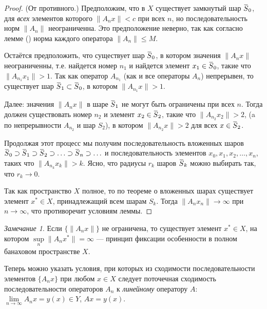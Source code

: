 \documentclass[12pt,a4paper,titlepage,oneside]{book}
\newcommand{\overbar}[1]{\mkern 1.5mu\overline{\mkern-1.5mu#1\mkern-1.5mu}\mkern 1.5mu}
\newcommand{\rom}[1]{\uppercase\expandafter{\romannumeral #1\relax}}
\theoremstyle{definition}
\theoremstyle{plain}
\theoremstyle{break}
\theoremstyle{remark}
\newtheorem*{remark}{Замечание}
\theoremstyle{remark}
\theoremstyle{remark}
\theoremstyle{remark}
\theoremstyle{plain}
\theoremstyle{plain}
\begin{document}
\begin{proof}
(От противного.)
Предположим, что в $X$ существует замкнутый шар $\overbar{S}_0$, для \textit{всех} элементов которого $\lVert A_n x\rVert < c$ при всех $n$, но последовательность норм $\lVert A_n\rVert$ неограниченна. Это предположение неверно, так как согласно лемме (\rom{1}) норма каждого оператора $\lVert A_n\rVert \leqslant M$.

Остаётся предположить, что существует шар $\overbar{S}_0$, в котором значения $\lVert A_n x\rVert$ неограниченны, т.е. найдется номер $n_1$ и найдется элемент $x_1 \in \overbar{S}_0$, такие что $\lVert A_{n_1} x_1 \rVert > 1$. Так как оператор $A_{n_1}$ (как и все операторы $A_n$) непрерывен, то существует шар $\overbar{S}_1 \subset \overbar{S}_0$, в котором $\lVert A_{n_1} x \rVert > 1$.

Далее: значения $\lVert A_n x\rVert$ в шаре $\overbar{S}_1$ не могут быть ограничены при всех $n$. Тогда должен существовать номер $n_2$ и элемент $x_2 \in \overbar{S}_2$, такие что $\lVert A_{n_2} x_2 \rVert > 2$, (a по непрерывности $A_{n_2}$ и шар $S_2$), в котором $\lVert A_{n_2} x \rVert > 2$ для всех $x \in \overbar{S}_2$.

Продолжая этот процесс мы получим последовательность вложенных шаров $\overbar{S}_0 \supset \overbar{S}_1 \supset \overbar{S}_2 \supset \ldots \supset \overbar{S}_n \supset \ldots$ и последовательность элементов $x_0, x_1, x_2, \ldots, x_n$, таких что $\lVert A_{n_k} x_k\rVert > k$. Ясно, что радиусы $r_k$ шаров $\overbar{S}_k$ можно выбирать так, что $r_k \to 0$.

Так как пространство $X$ полное, то по теореме о вложенных шарах существует элемент $x^* \in X$, принадлежащий всем шарам $S_k$. Тогда $\lVert A_n x_n\rVert \to \infty$ при $n \to \infty$, что противоречит условиям леммы.
\end{proof}

\begin{remark}
Если $\lbrace \lVert A_n x\rVert \rbrace$ не ограничена, то существует элемент $x^* \in X$, на котором $\sup\limits_n \lVert A_n x^*\rVert = \infty$ --- принцип фиксации особенности в полном банаховом пространстве $X$.
\end{remark}

Теперь можно указать условия, при которых из сходимости последовательности элементов $\lbrace A_n x\rbrace$ при любом $x \in X$ следует поточечная сходимость последовательности операторов $A_n$ к \textit{линейному} оператору $A$: $\lim\limits_{n \to \infty}A_n x = y(x) \in Y$, $Ax=y(x)$.
\end{document}
